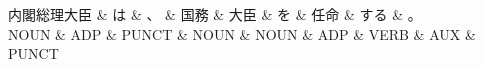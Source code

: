 \documentclass[tikz,border=5pt]{standalone}
\begin{document}
\normalsize
\begin{dependency}[edge unit distance=12.0pt]
    \begin{deptext}[column sep=1em]
        内閣総理大臣 \& は \& 、 \& 国務 \& 大臣 \& を \& 任命 \& する \& 。\\
        NOUN \& ADP \& PUNCT \& NOUN \& NOUN \& ADP \& VERB \& AUX \& PUNCT\\
    \end{deptext}
\end{dependency}
\end{document}
